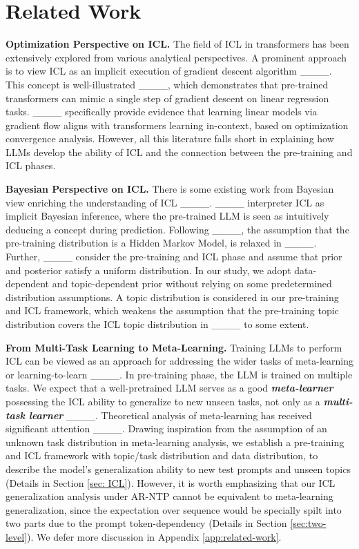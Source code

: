 \section{Related Work}
\textbf{Optimization Perspective on ICL.} \quad The field of ICL in transformers has been extensively explored from various analytical perspectives. 
A prominent approach is to view ICL as an implicit execution of gradient descent algorithm ____. This concept is well-illustrated ____, which demonstrates that pre-trained transformers can mimic a single step of gradient descent on linear regression tasks. 
____ specifically provide evidence that learning linear models via gradient flow aligns with transformers learning in-context, based on optimization convergence analysis. However, all this literature falls short in explaining how LLMs develop the ability of ICL and the connection between the pre-training and ICL phases. 

\textbf{Bayesian Perspective on ICL.} \quad There is some existing work from Bayesian view enriching the understanding of ICL ____. ____ interpreter ICL as implicit Bayesian inference, where the pre-trained LLM is seen as intuitively deducing a concept during prediction. 
Following ____, the assumption that the pre-training distribution is a Hidden Markov Model, is relaxed in ____.  
Further, ____ consider the pre-training and ICL phase and assume that prior and posterior satisfy a uniform distribution. In our study, we adopt data-dependent and topic-dependent prior without relying on some predetermined distribution assumptions. A topic distribution is considered in our pre-training and ICL framework, which weakens the assumption that the pre-training topic distribution covers the ICL topic distribution in ____ to some extent.

\textbf{From Multi-Task Learning to Meta-Learning.} \quad Training LLMs to perform ICL can be viewed as an approach for addressing the wider tasks of meta-learning or learning-to-learn ____. In pre-training phase, the LLM is trained on multiple tasks. We expect that a well-pretrained LLM serves as a good \textbf{\textit{meta-learner}} possessing the ICL ability to generalize to new unseen tasks, not only as a \textit{\textbf{multi-task learner}} ____. Theoretical analysis of meta-learning has received significant attention ____. Drawing inspiration from the assumption of an unknown task distribution in meta-learning analysis, we establish a pre-training and ICL framework with topic/task distribution and data distribution, to describe the model's generalization ability to new test prompts and unseen topics (Details in Section \ref{sec: ICL}). However, it is worth emphasizing that our ICL generalization analysis under AR-NTP cannot be equivalent to meta-learning generalization, since the expectation over sequence would be specially spilt into two parts due to the prompt token-dependency (Details in Section \ref{sec:two-level}). We defer more discussion in Appendix \ref{app:related-work}.